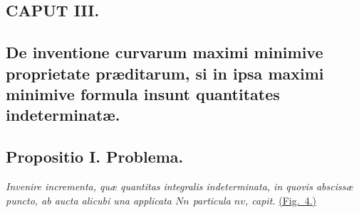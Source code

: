 \subsection*{CAPUT III.}
\subsection*{De inventione curvarum maximi minimive proprietate præditarum, si in ipsa maximi minimive formula insunt quantitates indeterminatæ.}
\subsection*{Propositio I. Problema.}
\textit{Invenire incrementa, quæ quantitas integralis indeterminata, in quovis abscissæ puncto, ab aucta alicubi una applicata $Nn$ particula $nv$, capit.} \hyperlink{fig:4}{(Fig.~4.)}
